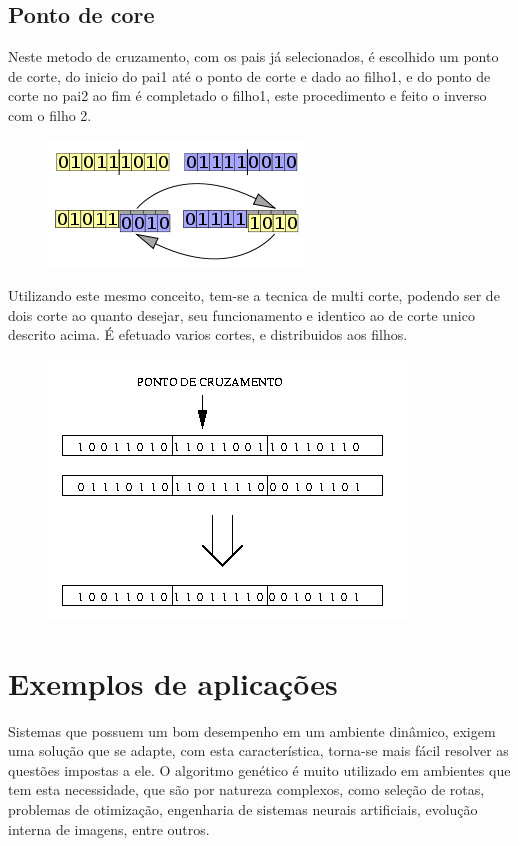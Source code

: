 \documentclass[a4paper,11pt]{article}
\begin{document}
\begin{multicols}{2}
\subsection{Ponto de core}
Neste metodo de cruzamento, com os pais já selecionados, é escolhido um ponto de corte, do inicio do pai1 até o ponto de corte e dado ao filho1, e do ponto de corte no pai2 ao fim é completado o filho1, este procedimento e feito o inverso com o filho 2.

\begin{figure}[!htb]
	\centering
	\includegraphics{imagens/corteUnico}
\end{figure}


Utilizando este mesmo conceito, tem-se a tecnica de multi corte, podendo ser de dois corte ao quanto desejar, seu funcionamento e identico ao de corte unico descrito acima. É efetuado varios cortes, e distribuidos aos filhos.

\begin{figure}[!htb]
	\centering
	\includegraphics{imagens/corteMult}
\end{figure}

\section{Exemplos de aplicações}
Sistemas que possuem um bom desempenho em um ambiente dinâmico, exigem uma solução que se adapte, com esta característica, torna-se mais fácil resolver as questões impostas a ele\cite{ref:andre2009b}. O algoritmo genético é muito utilizado em ambientes que tem esta necessidade, que são por natureza complexos, como seleção de rotas, problemas de otimização, engenharia de sistemas neurais artificiais, evolução interna de imagens, entre outros.



\end{multicols}
\end{document}
